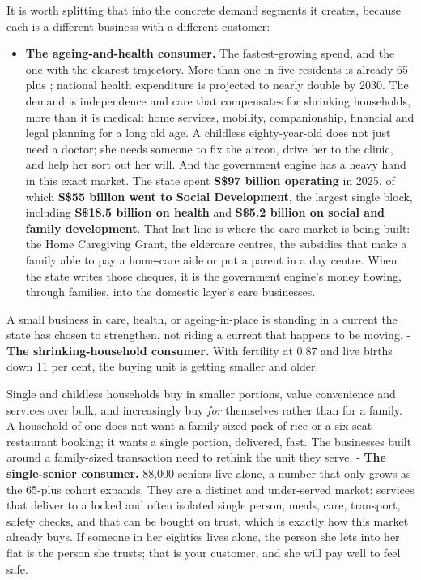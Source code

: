\documentclass[10pt,twoside,openany]{memoir}
\begin{document}
{{{{{{{{{{{{{It is worth splitting that into the concrete demand segments it creates,
because each is a different business with a different customer:

\begin{itemize}
\tightlist
\item
  \textbf{The ageing-and-health consumer.} The fastest-growing spend,
  and the one with the clearest trajectory. More than one in five
  residents is already 65-plus \cite{singstat-elderly}; national health
  expenditure is projected to nearly double by 2030. The demand is
  independence and care that compensates for shrinking households, more
  than it is medical: home services, mobility, companionship, financial
  and legal planning for a long old age. A childless eighty-year-old
  does not just need a doctor; she needs someone to fix the aircon,
  drive her to the clinic, and help her sort out her will. And the
  government engine has a heavy hand in this exact market. The state
  spent \textbf{S\$97 billion operating} in 2025, of which \textbf{S\$55
  billion went to Social Development}, the largest single block,
  including \textbf{S\$18.5 billion on health} and \textbf{S\$5.2
  billion on social and family development}. That last line is where the
  care market is being built: the Home Caregiving Grant, the eldercare
  centres, the subsidies that make a family able to pay a home-care aide
  or put a parent in a day centre. When the state writes those cheques,
  it is the government engine's money flowing, through families, into
  the domestic layer's care businesses.
\end{itemize}

A small business in care, health, or ageing-in-place is standing in a
current the state has chosen to strengthen, not riding a current that
happens to be moving. - \textbf{The shrinking-household consumer.} With
fertility at 0.87 and live births down 11 per cent, the buying unit is
getting smaller and older.

Single and childless households buy in smaller portions, value
convenience and services over bulk, and increasingly buy \emph{for}
themselves rather than for a family. A household of one does not want a
family-sized pack of rice or a six-seat restaurant booking; it wants a
single portion, delivered, fast. The businesses built around a
family-sized transaction need to rethink the unit they serve. -
\textbf{The single-senior consumer.} 88,000 seniors live alone, a number
that only grows as the 65-plus cohort expands. They are a distinct and
under-served market: services that deliver to a locked and often
isolated single person, meals, care, transport, safety checks, and that
can be bought on trust, which is exactly how this market already buys.
If someone in her eighties lives alone, the person she lets into her
flat is the person she trusts; that is your customer, and she will pay
well to feel safe.

}}}}}}}}}}}}}
\end{document}
